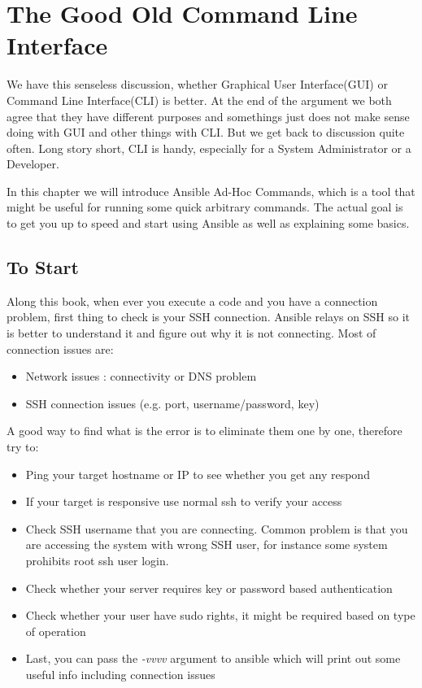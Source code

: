 \documentclass[10pt]{book}
\begin{document}
\chapter{The Good Old Command Line Interface}
We have this senseless discussion, whether Graphical User Interface(GUI) or Command Line Interface(CLI) is better. 
At the end of the argument we both agree that they have 
different purposes and somethings just does not make sense doing with GUI and 
other things with CLI. But we get back to discussion quite often. Long story short, CLI is handy, 
especially for a System Administrator or a Developer. 

In this chapter we will introduce Ansible Ad-Hoc Commands, which is a tool that might be useful for 
running some quick arbitrary commands. The actual goal is to get you up to speed 
and start using Ansible as well as explaining some basics.


\section{To Start}
Along this book, when ever you execute a code and you have a connection problem, 
first thing to check is your SSH connection. Ansible relays on SSH so it is better to understand it and
figure out why it is not connecting. Most of connection issues are:

\begin{itemize}
\item Network issues : connectivity or DNS problem
\item SSH connection issues (e.g. port, username/password, key) 
\end{itemize}

A good way to find what is the error is to eliminate them one by one, therefore try to:
\begin{itemize}
\item Ping your target hostname or IP to see whether you get any respond
\item If your target is responsive use normal ssh to verify your access
\item Check SSH username that you are connecting. Common problem is that you are 
accessing the system with wrong SSH user, for instance some system prohibits root 
ssh user login.
\item Check whether your server requires key or password based authentication
\item Check whether your user have sudo rights, it might be required based on type of operation
\item Last, you can pass the \emph{-vvvv} argument to ansible which will print out some useful info 
including connection issues
\end{itemize}
\end{document}
